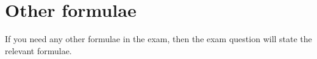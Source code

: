 \documentclass{amsart}
\begin{document}
\section*{Other formulae}

If you need any other formulae in the exam, then the exam question
will state the relevant formulae.
\end{document}
